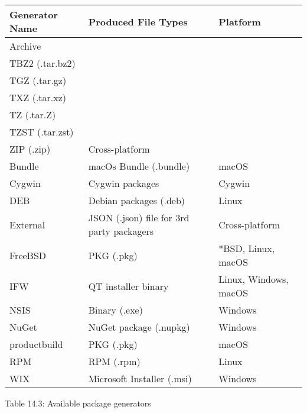 \begin{longtable}{|l|l|l|}
\hline
\textbf{Generator Name} & \textbf{Produced File Types}              & \textbf{Platform}     \\ \hline
\endfirsthead
%
\endhead
%
Archive &
\begin{tabular}[c]{@{}l@{}}7Z, 7zip - (.7z)\\ TBZ2 (.tar.bz2)\\ TGZ (.tar.gz)\\ TXZ (.tar.xz)\\ TZ (.tar.Z)\\ TZST (.tar.zst)\\ ZIP (.zip)\end{tabular} &
Cross-platform \\ \hline
Bundle                  & macOs Bundle (.bundle)                    & macOS                 \\ \hline
Cygwin                  & Cygwin packages                           & Cygwin                \\ \hline
DEB                     & Debian packages (.deb)                    & Linux                 \\ \hline
External                & JSON (.json) file for 3rd party packagers & Cross-platform        \\ \hline
FreeBSD                 & PKG (.pkg)                                & *BSD, Linux, macOS    \\ \hline
IFW                     & QT installer binary                       & Linux, Windows, macOS \\ \hline
NSIS                    & Binary (.exe)                             & Windows               \\ \hline
NuGet                   & NuGet package (.nupkg)                    & Windows               \\ \hline
productbuild            & PKG (.pkg)                                & macOS                 \\ \hline
RPM                     & RPM (.rpm)                                & Linux                 \\ \hline
WIX                     & Microsoft Installer (.msi)                & Windows               \\ \hline
\end{longtable}

\begin{center}
Table 14.3: Available package generators
\end{center}

